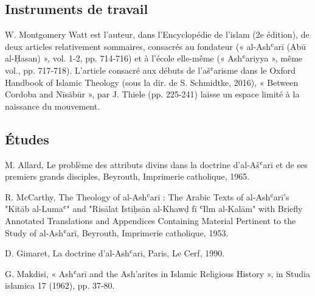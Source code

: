   \subsection{Instruments de travail}
    W. Montgomery Watt est l’auteur, dans l’Encyclopédie de l’islam (2e édition), de deux articles relativement sommaires, consacrés au fondateur (« al-Ashʿarī (Abū al-Ḥasan) », vol. 1-2, pp. 714-716) et à l’école elle-même (« Ashʿariyya », même vol., pp. 717-718).  L’article consacré aux débuts de l’ašʿarisme dans le Oxford Handbook of Islamic Theology (sous la dir. de S. Schmidtke, 2016), « Between Cordoba and Nīsābūr », par J. Thiele (pp. 225-241) laisse un espace limité à la naissance du mouvement. 
    \subsection{Études }
    M. Allard, Le problème des attributs divins dans la doctrine d'al-Ašʿarī et de ses premiers grands disciples, Beyrouth, Imprimerie catholique, 1965. 
    
    R. McCarthy, The Theology of al-Ashʿarī : The Arabic Texts of al-Ashʿarī's "Kitāb al-Lumaʿ" and "Risālat Istiḥsān al-Khawḍ fī ʿIlm al-Kalām" with Briefly Annotated Translations and Appendices Containing Material Pertinent to the Study of al-Ashʿarī, Beyrouth, Imprimerie catholique, 1953. 
    
    D. Gimaret, La doctrine d’al-Ashʿarī, Paris, Le Cerf, 1990. 
    
    G. Makdisi, « Ashʿarī and the Ash'arites in Islamic Religious History », in Studia islamica 17 (1962), pp. 37-80. 